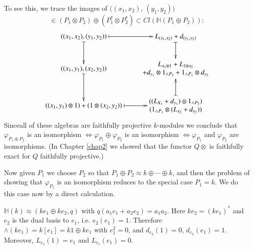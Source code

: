 \begin{proofof}
To see this, we trace the images of $((x_1, x_2)$, $(y_1, y_2))$  
$$
\in (P_1 \otimes P_2) \oplus (P^\ast_1 \otimes P^\ast_2 ) \subset Cl (
\mathbb{H} (P_1 \oplus P_2)): 
$$
\[
\xymatrix{
((x_1, x_2), (y_1, y_2)) \ar@{|->}[r] \ar@{|->}[d] & L_{(x_1, x_2)} +
  d_{(y_1, y_2)} \ar@{|->}[d]\\
((x_1, y_1), (x_2, y_2)) \ar@{|->}[d] &  
\text{$\begin{matrix}
L_{x_1 \otimes 1} + L_{1 \otimes x_2}\\ 
+ d_{y_1} \otimes 1_{\wedge P_2} + 1_{\wedge P_1}
    \otimes d_{y_2}
  \end{matrix}$}\\
((x_1, y_1) \otimes 1) + (1 \otimes (x_2, y_2)) \ar@{|->}[r] &
\text{$\begin{matrix}
((L_{X_1} + d_{y_1}) \otimes 1_{\wedge P_2})\\
(1_{\wedge P_1} \otimes (L_{x_2} + d_{y_2}))
  \end{matrix}$}\ar@{|->}[u]
}
\]
Since\pageoriginale all of these algebras are faithfully projective
$k$-modules we conclude that $\varphi_{P_1 \oplus P_2} $ is an
isomorphism $\Leftrightarrow \varphi_{P_1} \oplus \varphi_{P_{2}}$ is an
isomorphism $\Leftrightarrow \varphi_{P_1}$ and $\varphi_{P_2}$ are
isomorphisms. (In Chapter \ref{chap2} we showed that the functor $Q
\otimes$ is faithfully exact for $Q$ faithfully projective.)  

Now given $P_1$ we choose $P_2$ so that $P_1 \oplus P_2 \approx k
\oplus \cdots \oplus k$, and then the problem of showing that
$\varphi_{P_1}$ is an isomorphism reduces to the special case $P_1 =
k$. We do this case now by a direct calculation.  

$\mathbb{H} (k) \approx (ke_1 \oplus ke_2, q)$ with $q(a_1 e_1 + a_2
e_2) = a_1 a_2$. Here $ke_2 = (ke_1)^\ast$ and $e_2$ is the dual basis to
$e_1$, i.e. $e_2(e_1) = 1$. Therefore $\wedge (ke_1) = k[e_1] = k1
\oplus ke_1$ with $e^2_1 = 0$, and $d_{e_2}(1) = 0$, $d_{e_2}(e_1)
=1$. Moreover, $L_{e_1}(1) = e_1$ and $L_{e_1} (e_1) = 0$. 


\end{proofof}
